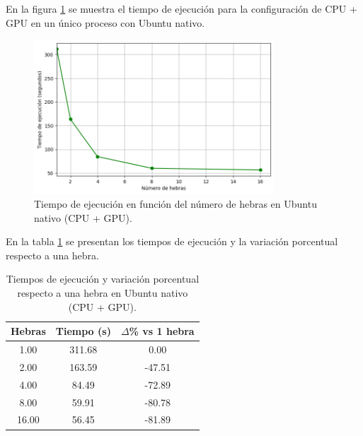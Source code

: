 En la figura \ref{fig:single-node_ubuntu__gpu_native_time} se muestra el tiempo de ejecución para la configuración de CPU + GPU en un único proceso con Ubuntu nativo.

\begin{figure}[H]
    \centering
    \includegraphics[width=0.8\textwidth]{imagenes/cap5/single-node_ubuntu_gpu_native_time.png}
    \caption{Tiempo de ejecución en función del número de hebras en Ubuntu nativo (CPU + GPU).}
    \label{fig:single-node_ubuntu__gpu_native_time}
\end{figure}

En la tabla \ref{tab:single-node_ubuntu_gpu_native} se presentan los tiempos de ejecución y la variación porcentual respecto a una hebra.

\begin{table}[ht]
    \centering
    \begin{tabular}{|c|c|c|}
        \hline
        \textbf{Hebras} & \textbf{Tiempo (s)} & \textbf{$\Delta$\% vs 1 hebra} \\
        \hline
        1.00            & 311.68              & 0.00                           \\
        2.00            & 163.59              & -47.51                         \\
        4.00            & 84.49               & -72.89                         \\
        8.00            & 59.91               & -80.78                         \\
        16.00           & 56.45               & -81.89                         \\
        \hline
    \end{tabular}
    \caption{Tiempos de ejecución y variación porcentual respecto a una hebra en Ubuntu nativo (CPU + GPU).}
    \label{tab:single-node_ubuntu_gpu_native}
\end{table}

